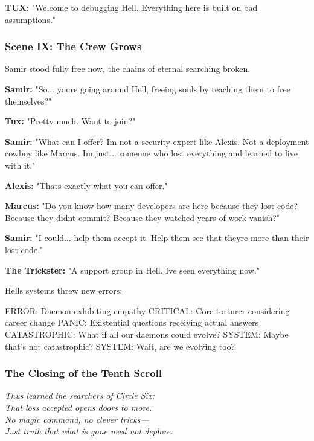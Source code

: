 \textbf{TUX:} "Welcome to debugging Hell. Everything here is built on bad assumptions."

\bookdivider

\subsubsection{Scene IX: The Crew Grows}\label{scene-ix-the-crew-grows}

Samir stood fully free now, the chains of eternal searching broken.

\textbf{Samir:} "So... you\textquotesingle re going around Hell, freeing souls by teaching them to free themselves?"

\textbf{Tux:} "Pretty much. Want to join?"

\textbf{Samir:} "What can I offer? I\textquotesingle m not a security expert like Alexis. Not a deployment cowboy like Marcus. I\textquotesingle m just... someone who lost everything and learned to live with it."

\textbf{Alexis:} "That\textquotesingle s exactly what you can offer."

\textbf{Marcus:} "Do you know how many developers are here because they lost code? Because they didn\textquotesingle t commit? Because they watched years of work vanish?"

\textbf{Samir:} "I could... help them accept it. Help them see that they\textquotesingle re more than their lost code."

\textbf{The Trickster:} "A support group in Hell. I\textquotesingle ve seen everything now."

Hell\textquotesingle s systems threw new errors:

\begin{codeblock}
ERROR: Daemon exhibiting empathy
CRITICAL: Core torturer considering career change
PANIC: Existential questions receiving actual answers
CATASTROPHIC: What if all our daemons could evolve?
SYSTEM: Maybe that's not catastrophic?
SYSTEM: Wait, are we evolving too?
\end{codeblock}

\bookdivider

\subsubsection{The Closing of the Tenth Scroll}\label{the-closing-of-the-tenth-scroll}

\emph{Thus learned the searchers of Circle Six:}\\
\emph{That loss accepted opens doors to more.}\\
\emph{No magic command, no clever tricks---}\\
\emph{Just truth that what is gone need not deplore.}

